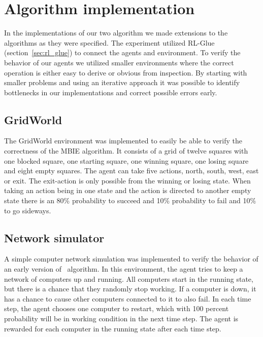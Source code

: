 \section{Algorithm implementation}
\label{sec:implementation}

In the implementations of our two algorithm we made extensions to the
algorithms as they were specified.  The experiment utilized RL-Glue
(section~\ref{sec:rl_glue}) to connect the agents and environment.  To verify
the behavior of our agents we utilized smaller environments where the correct
operation is either easy to derive or obvious from inspection. By starting with
smaller problems and using an iterative approach it was possible to identify
bottlenecks in our implementations and correct possible errors early.





\subsection{GridWorld}
\label{sec:intro_grid_world}

The GridWorld environment was implemented to easily be able to verify the
correctness of the MBIE algorithm. It consists of a grid of twelve squares with
one blocked square, one starting square, one winning square, one losing square and
eight empty squares. The agent can take five actions, north, south, west,
east or exit. The exit-action is only possible from the winning or losing
state. When taking an action being in one state and the action is directed to
another empty state there is an 80\% probability to succeed and 10\%
probability to fail and 10\% to go sideways.

\subsection{Network simulator}

A simple computer network simulation was implemented to verify the behavior of an
early version of \etre\ algorithm. In this environment, the agent tries to keep
a network of computers up and running. All computers start in the running
state, but there is a chance that they randomly stop working. If a computer is
down, it has a chance to cause other computers connected to it to also fail. In
each time step, the agent chooses one computer to restart, which with 100
percent probability will be in working condition in the next time step. The
agent is rewarded for each computer in the running state after each time step. 
